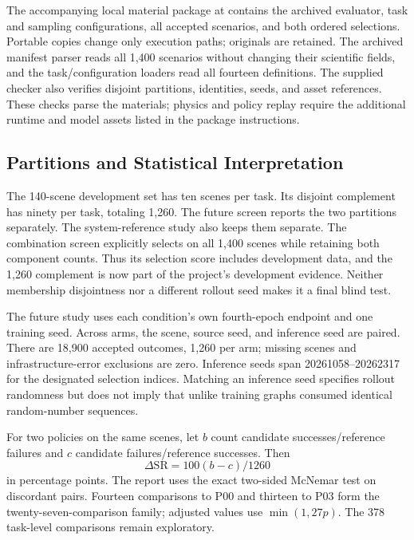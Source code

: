 The accompanying local material package at
 contains the archived evaluator, task and
sampling configurations, all accepted scenarios, and both ordered selections.
Portable copies change only execution paths; originals are retained.
The archived manifest parser reads all 1,400 scenarios without changing their
scientific fields, and the task/configuration loaders read all fourteen
definitions. The supplied checker also verifies disjoint partitions, identities,
seeds, and asset references. These checks parse the materials; physics and
policy replay require the additional runtime and model assets listed in the
package instructions.

\subsection{Partitions and Statistical Interpretation}
The 140-scene development set has ten scenes per task. Its disjoint complement
has ninety per task, totaling 1,260. The future screen reports the two
partitions separately. The system-reference study also keeps them separate.
The combination screen explicitly selects on all 1,400 scenes while retaining
both component counts. Thus its selection score includes development data,
and the 1,260 complement is now part of the project's development evidence.
Neither membership disjointness nor a different rollout seed makes it a final
blind test.

The future study uses each condition's own fourth-epoch endpoint and one
training seed. Across arms, the scene, source seed, and inference seed are
paired. There are 18,900 accepted outcomes, 1,260 per arm; missing scenes and
infrastructure-error exclusions are zero. Inference seeds span
20261058--20262317 for the designated selection indices. Matching an inference
seed specifies rollout randomness but does not imply that unlike training
graphs consumed identical random-number sequences.

For two policies on the same scenes, let $b$ count candidate successes/reference
failures and $c$ candidate failures/reference successes. Then
\begin{equation}
 \Delta\mathrm{SR}=100(b-c)/1260
\end{equation}
in percentage points. The report uses the exact two-sided McNemar test on
discordant pairs. Fourteen comparisons to P00 and thirteen to P03 form the
twenty-seven-comparison family; adjusted values use
$\min(1,27p)$. The 378 task-level comparisons remain exploratory.

